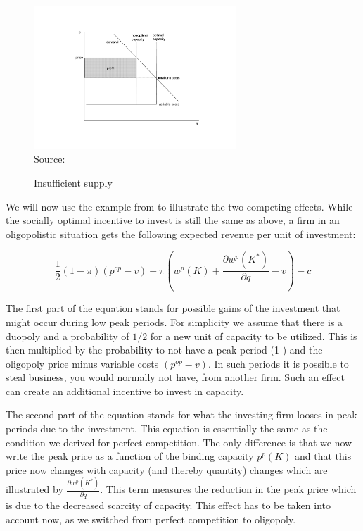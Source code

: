 \begin{figure}[h]
\centering
\caption{Insufficient supply}
\includegraphics[width=3.0in]{capacity/imperfect_spot_pricing2}
      \label{peak_load_insufficient}  
\\          
\scriptsize Source: \cite{Fehr1995}
\end{figure}

We will now use the example from \cite{Fehr1995} to illustrate the two competing effects.
While the socially optimal incentive to invest is still the same as above, a firm in an oligopolistic situation gets the following expected revenue per unit of investment:

\begin{equation*}
	\frac{1}{2} (1-\pi) (p^{op}-v) + \pi \left(w^p(K)+\frac{\partial w^p(K^*)}{\partial q}-v\right) - c
\end{equation*}

The first part of the equation stands for possible gains of the investment that might occur during low peak periods. For simplicity we assume that there is a duopoly and a probability of $1/2$ for a new unit of capacity to be utilized. This is then multiplied by the probability to not have a peak period (1-\pi) and the oligopoly price minus variable costs $(p^{op}-v)$. In such periods it is possible to steal business, you would normally not have, from another firm. Such an effect can create an additional incentive to invest in capacity. %

The second part of the equation stands for what the investing firm looses in peak periods due to the investment. This equation is essentially the same as the condition we derived for perfect competition. The only difference is that we now write the peak price as a function of the binding capacity $p^p(K)$ and that this price now changes with capacity (and thereby quantity) changes which are illustrated by $\frac{\partial w^p(K^*)}{\partial q}$. This term measures the reduction in the peak price which is due to the decreased scarcity of capacity. This effect has to be taken into account now, as we switched from perfect competition to oligopoly.

